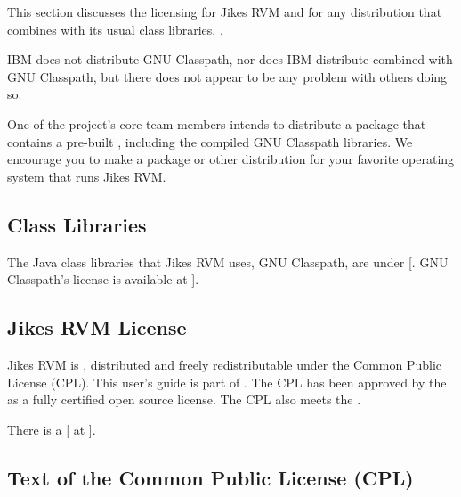 %
This section discusses the licensing for Jikes\TMweb{} RVM and for
any distribution that combines \jrvm{} with its usual class
libraries,
.

IBM does not distribute GNU Classpath, nor does IBM distribute
\jrvm{} combined with GNU Classpath, but there does not appear to be
any problem with others doing so.

One of the project's core team members intends
to distribute a  package that
contains a pre-built \jrvm{}, including the compiled GNU Classpath
libraries.  We encourage you to make a package or other distribution
for your favorite operating system that runs Jikes RVM.

\subsection{Class Libraries}

%
%
%
The Java class libraries that Jikes RVM uses, GNU Classpath, 
are under [.  GNU Classpath's
license is available at {\tt \classpathLicenseURL}]{\classpathLicenseURL}.  

%
%
%
%
%
\subsection{Jikes RVM License}

Jikes\TMweb{} RVM is ,
distributed and freely redistributable under the Common Public License (CPL).  
This user's guide is part of \jrvm{}.
The CPL has been approved by the 
as a fully certified open source license.  The CPL also meets the
.

There is a [ at \texttt{\CPLFAQURL}]{\CPLFAQURL}.

\subsection{Text of the Common Public License (CPL)}
%
%


%

